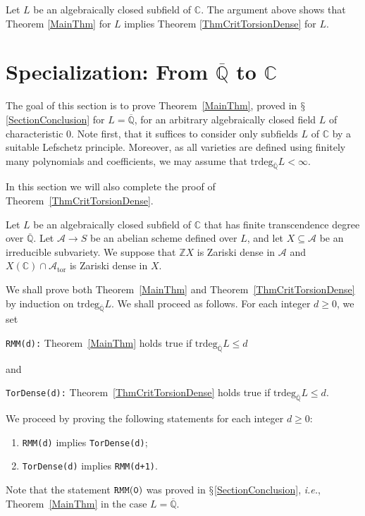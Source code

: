 \documentclass[12pt,oneside]{amsart}
\numberwithin{maincounter}{section}
\numberwithin{equation}{section}
\def\CC{\mathbb{C}}
\def\ZZ{\mathbb{Z}}
\def\QQ{\mathbb{Q}}
\newcommand{\cal}{\mathcal}
\newcommand{\cA}{\cal{A}}
\newcommand{\IC}{{\CC}}
\newcommand{\IQbar}{{\overline{\QQ}}}
\begin{document}
Let $L$ be an algebraically closed subfield of $\IC$.
The argument above shows that   Theorem \ref{MainThm} for $L$ implies Theorem
\ref{ThmCritTorsionDense} for $L$.




\section{Specialization: From $\IQbar$ to $\IC$}
\label{SectionSpecialization}
The goal of this section is to prove Theorem~\ref{MainThm}, proved in
$\mathsection$\ref{SectionConclusion} for $L=\IQbar$, for an arbitrary
algebraically closed field $L$ of characteristic $0$. Note first, that
it suffices to consider only subfields $L$ of $\IC$ by a suitable
Lefschetz principle. Moreover, as all varieties are defined using
finitely many polynomials and coefficients, we may assume that
$\mathrm{trdeg}_\IQbar L <\infty$. 

In this section we will also complete the proof of Theorem~\ref{ThmCritTorsionDense}.

Let $L$ be an algebraically closed subfield of $\IC$ that has finite
transcendence degree over $\IQbar$. Let $\cA
\rightarrow S$ be an abelian scheme defined over $L$, and let $X
\subseteq \cA$ be an irreducible subvariety. We suppose that $\ZZ X$
is Zariski dense in $\cA$ and $X(\IC) \cap \cA_{\mathrm{tor}}$ is
Zariski dense in $X$.

We shall prove both Theorem~\ref{MainThm} and
Theorem~\ref{ThmCritTorsionDense} by induction on $
\mathrm{trdeg}_{\IQbar} L$. We shall proceed as follows. For each
integer $d \ge 0$, we set
\begin{center}
  {\tt RMM(d):} Theorem~\ref{MainThm} holds true if
  $\mathrm{trdeg}_\IQbar L\le d$ %
\end{center}
and
\begin{center}
  {\tt TorDense(d):} Theorem~\ref{ThmCritTorsionDense} holds true if
  $\mathrm{trdeg}_\IQbar L\le d$. %
\end{center}
We proceed by proving the following statements
for each integer $d \ge 0$:
\begin{enumerate}
\item[(i)] {\tt RMM(d)} implies {\tt TorDense(d)};
\item[(ii)] {\tt TorDense(d)} implies {\tt RMM(d+1)}.
\end{enumerate}
Note that the
statement ${\tt RMM(0)}$ was proved in
$\mathsection$\ref{SectionConclusion}, \textit{i.e.},
Theorem~\ref{MainThm} in the case $L=\IQbar$.
\end{document}
